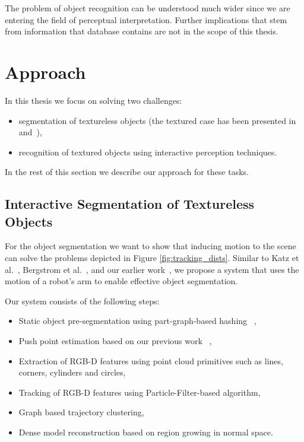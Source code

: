 The problem of object recognition can be understood much wider since we are entering the field of perceptual interpretation. Further implications that stem from information that database contains are not in the scope of this thesis.



\section{Approach} 

In this thesis we focus on solving two challenges: 

\begin{itemize} 
\item segmentation of textureless objects (the textured case has been presented in~\cite{bersch12interactive} and~\cite{Katz-WS-MM-ICRA2011}),

\item recognition of textured objects using interactive perception techniques.
\end{itemize} 

In the rest of this section we describe our approach for these tasks.

\subsection{Interactive Segmentation of Textureless Objects} 


For the object segmentation 
 we want to show that inducing motion to the scene can solve the problems depicted in Figure \ref{fig:tracking_dists}. Similar  to Katz  et al.~\cite{Katz-WS-MM-ICRA2011}, Bergstrom et
al.~\cite{bergstrom11icvs}, and our earlier
work~\cite{bersch12interactive}, we propose a system that uses the
motion of a robot's arm to enable effective
object  segmentation.

Our system consists of the following steps:

\begin{itemize} 
\item Static object pre-segmentation using part-graph-based hashing ~\cite{marton12SC},
\item Push point estimation based on our previous work ~\cite{bersch12interactive},
\item Extraction of RGB-D features using point cloud primitives such as lines, corners, cylinders and circles,
\item Tracking of RGB-D features using Particle-Filter-based algorithm,
\item Graph based trajectory clustering,
\item Dense model reconstruction based on region growing in normal space.
\end{itemize} 



